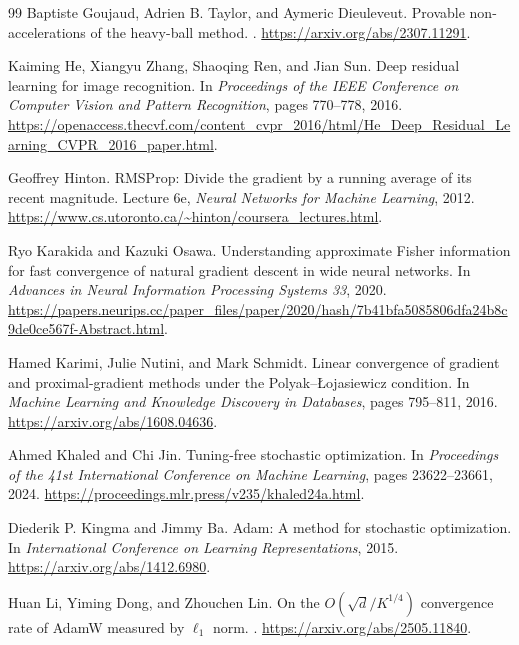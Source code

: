 \documentclass[11pt,twoside]{article}
\theoremstyle{definition}
\theoremstyle{remark}
\begin{document}
\begin{thebibliography}{99}
Baptiste Goujaud, Adrien B. Taylor, and Aymeric Dieuleveut.
\newblock Provable non-accelerations of the heavy-ball method.
.
\newblock \url{https://arxiv.org/abs/2307.11291}.

Kaiming He, Xiangyu Zhang, Shaoqing Ren, and Jian Sun.
\newblock Deep residual learning for image recognition.
\newblock In \emph{Proceedings of the IEEE Conference on Computer Vision and
Pattern Recognition}, pages 770--778, 2016.
\newblock \url{https://openaccess.thecvf.com/content_cvpr_2016/html/He_Deep_Residual_Learning_CVPR_2016_paper.html}.

Geoffrey Hinton.
\newblock RMSProp: Divide the gradient by a running average of its recent
magnitude.
\newblock Lecture 6e, \emph{Neural Networks for Machine Learning}, 2012.
\newblock \url{https://www.cs.utoronto.ca/~hinton/coursera_lectures.html}.

Ryo Karakida and Kazuki Osawa.
\newblock Understanding approximate Fisher information for fast convergence
of natural gradient descent in wide neural networks.
\newblock In \emph{Advances in Neural Information Processing Systems 33},
2020.
\newblock \url{https://papers.neurips.cc/paper_files/paper/2020/hash/7b41bfa5085806dfa24b8c9de0ce567f-Abstract.html}.

Hamed Karimi, Julie Nutini, and Mark Schmidt.
\newblock Linear convergence of gradient and proximal-gradient methods under
the Polyak--\L{}ojasiewicz condition.
\newblock In \emph{Machine Learning and Knowledge Discovery in Databases},
pages 795--811, 2016.
\newblock \url{https://arxiv.org/abs/1608.04636}.

Ahmed Khaled and Chi Jin.
\newblock Tuning-free stochastic optimization.
\newblock In \emph{Proceedings of the 41st International Conference on
Machine Learning}, pages 23622--23661, 2024.
\newblock \url{https://proceedings.mlr.press/v235/khaled24a.html}.

Diederik P. Kingma and Jimmy Ba.
\newblock Adam: A method for stochastic optimization.
\newblock In \emph{International Conference on Learning Representations},
2015.
\newblock \url{https://arxiv.org/abs/1412.6980}.

Huan Li, Yiming Dong, and Zhouchen Lin.
\newblock On the $O(\sqrt{d}/K^{1/4})$ convergence rate of AdamW measured by
$\ell_1$ norm.
.
\newblock \url{https://arxiv.org/abs/2505.11840}.


\end{thebibliography}
\end{document}
